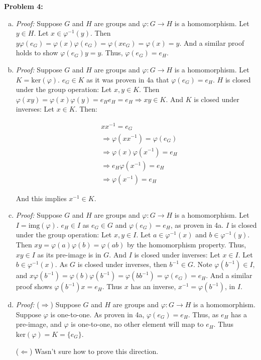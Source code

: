 \documentclass[12pt, letterpaper]{article}
\newenvironment{problem}
    [1]
    {\noindent \textbf{Problem #1:}}
    {\vspace{3mm}}
\begin{document}
\begin{problem}{4}
    \begin{enumerate}[(a)]
        \item \emph{Proof:} Suppose $G$ and $H$ are groups and $\varphi: G \rightarrow H$ is a homomorphism.
        Let $y \in H$. Let $x \in \varphi^{-1}(y)$. Then $y\varphi(e_G) = \varphi(x)\varphi(e_G) =
        \varphi(xe_G) = \varphi(x) = y$. And a similar proof holds to show $\varphi(e_G)y = y$. Thus,
        $\varphi(e_G) = e_H$.

        \item \emph{Proof:} Suppose $G$ and $H$ are groups and $\varphi: G \rightarrow H$ is a homomorphism. 
        Let $K = \text{ker}(\varphi)$. $e_G \in K$ as it was proven in 4a that $\varphi(e_G) = e_H$. $H$ is closed 
        under the group operation: Let $x, y \in K$. Then $\varphi(xy) = \varphi(x)\varphi(y) = e_He_H = 
        e_H \Rightarrow xy \in K$. And $K$ is closed under inverses: Let $x \in K$. Then:

        \begin{align*}
            &xx^{-1} = e_G\\
            &\Rightarrow \varphi(xx^{-1}) = \varphi(e_G)\\
            &\Rightarrow \varphi(x)\varphi(x^{-1}) = e_H\\
            &\Rightarrow e_H\varphi(x^{-1}) = e_H\\
            &\Rightarrow \varphi(x^{-1}) = e_H
        \end{align*}

        And this implies $x^{-1} \in K$.

        \item \emph{Proof:}
        Suppose $G$ and $H$ are groups and $\varphi: G \rightarrow H$ is a homomorphism. 
        Let $I = \text{img}(\varphi)$. $e_H \in I$ as $e_G \in G$ and $\varphi(e_G) = e_H$, as proven in 4a.
        $I$ is closed under the group operation: Let $x, y \in I$. Let $a \in \varphi^{-1}(x)$ and
        $b \in \varphi^{-1}(y)$. Then $xy = \varphi(a)\varphi(b) = \varphi(ab)$ by the homomorphism
        property. Thus, $xy \in I$ as its pre-image is in $G$. And $I$ is closed under inverses:
        Let $x \in I$. Let $b \in \varphi^{-1}(x)$. As $G$ is closed under inverses, then $b^{-1} \in G$.
        Note $\varphi(b^{-1}) \in I$, and $x\varphi(b^{-1}) = \varphi(b)\varphi(b^{-1}) = \varphi(bb^{-1}) =
        \varphi(e_G) = e_H$. And a similar proof shows $\varphi(b^{-1})x = e_H$. Thus $x$ has an inverse, 
        $x^{-1} = \varphi(b^{-1})$, in $I$.

        \item \emph{Proof:} ($\Rightarrow$) 
        Suppose $G$ and $H$ are groups and $\varphi: G \rightarrow H$ is a homomorphism. 
        Suppose $\varphi$ is one-to-one. As proven in 4a, $\varphi(e_G) = e_H$. Thus,
        as $e_H$ has a pre-image, and $\varphi$ is one-to-one, no other element will map
        to $e_H$. Thus $\text{ker}(\varphi) = K = \{e_G\}$.

        \bigskip\noindent
        ($\Leftarrow$) Wasn't sure how to prove this direction.
    \end{enumerate}
\end{problem}
\end{document}
